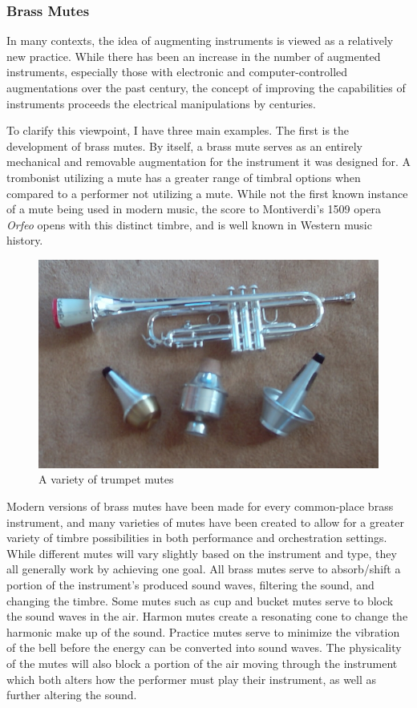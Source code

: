 \subsubsection{Brass Mutes}
In many contexts, the idea of augmenting instruments is viewed as a relatively new practice. While there has been an increase in the number of augmented instruments, especially those with electronic and computer-controlled augmentations over the past century, the concept of improving the capabilities of instruments proceeds the electrical manipulations by centuries.

To clarify this viewpoint, I have three main examples. The first is the development of brass mutes. By itself, a brass mute serves as an entirely mechanical and removable augmentation for the instrument it was designed for. A trombonist utilizing a mute has a greater range of timbral options when compared to a performer not utilizing a mute. While not the first known instance of a mute being used in modern music, the score to Montiverdi's 1509 opera \textit{Orfeo} opens with this distinct timbre, and is well known in Western music history.

\begin{figure}
    \centering
    \includegraphics[scale=0.35]{diagrams/TrumpetMutes.jpg}
    \caption{A variety of trumpet mutes} %
    \label{fig:tptmutes}
\end{figure}

Modern versions of brass mutes have been made for every common-place brass instrument, and many varieties of mutes have been created to allow for a greater variety of timbre possibilities in both performance and orchestration settings. While different mutes will vary slightly based on the instrument and type, they all generally work by achieving one goal. All brass mutes serve to absorb/shift a portion of the instrument's produced sound waves, filtering the sound, and changing the timbre. Some mutes such as cup and bucket mutes serve to block the sound waves in the air. Harmon mutes create a resonating cone to change the harmonic make up of the sound. Practice mutes serve to minimize the vibration of the bell before the energy can be converted into sound waves. The physicality of the mutes will also block a portion of the air moving through the instrument which both alters how the performer must play their instrument, as well as further altering the sound\cite{brassMutes1982}.

